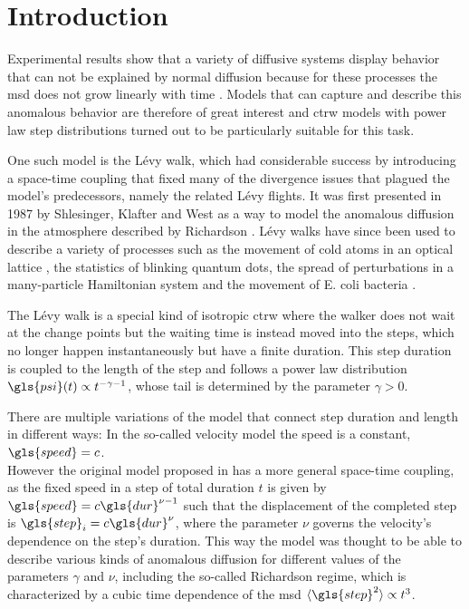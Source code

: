 \chapter{Introduction}

Experimental results show that a variety of diffusive systems display behavior that can not be explained by normal diffusion because for these processes the \gls{msd} does not grow linearly with time
\cite{xu2011,sagi2012,marty2005,amblard1996}
. 
Models that can capture and describe this anomalous behavior are therefore of great interest and \gls{ctrw} models with power law step distributions turned out to be particularly suitable for this task.

One such model is the L\'evy walk, which had considerable success by introducing a space-time coupling that fixed many of the divergence issues that plagued the model's predecessors, namely the related L\'evy flights. It was first presented in 1987 by Shlesinger, Klafter and West 
\cite{shlesinger1987} 
as a way to model the anomalous diffusion in the atmosphere described by Richardson 
\cite{richardson}. 
L\'evy walks have since been used to describe a variety of processes 
\cite{lwreview} 
such as the movement of cold atoms in an optical lattice 
\cite{marksteiner1996}, 
the statistics of blinking quantum dots, the spread of perturbations in a many-particle Hamiltonian system 
\cite{zaburdaev2011perturbation} 
and the movement of E. coli bacteria 
\cite{korobkova2004}.

The L\'evy walk is a special kind of isotropic \gls{ctrw} where the walker does not wait at the change points but the waiting time is instead moved into the steps, which no longer happen instantaneously but have a finite duration. This step duration is coupled to the length of the step and follows a power law distribution $\gls{psi}(t) \propto t^{-\gamma-1}$, whose tail is determined by the parameter $\gamma>0$. 

There are multiple variations of the model that connect step duration and length in different ways: In the so-called velocity model the speed is a constant, $\gls{speed} = c$.\\
However the original model proposed in 
\cite{shlesinger1987} 
has a more general space-time coupling, as the fixed speed in a step of total duration $t$ is given by $\gls{speed} = c  \gls{dur}^{\nu-1}$ such that the displacement of the completed step is $\gls{step}_i = c \gls{dur}^{\nu}$, where the parameter $\nu$ governs the velocity's dependence on the step's duration. This way the model was thought to be able to describe various kinds of anomalous diffusion for different values of the parameters $\gamma$ and $\nu$, including the so-called Richardson regime, which is characterized by a cubic time dependence of the \gls{msd} $\mean{\gls{step}^2} \propto t^3$. 

